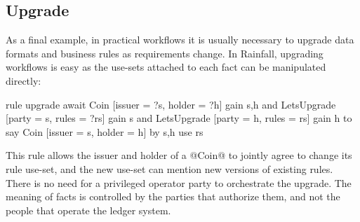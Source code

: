 \subsection{Upgrade}
\label{s:Upgrade}
As a final example, in practical workflows it is usually necessary to upgrade data formats and business rules as requirements change. In Rainfall, upgrading workflows is easy as the use-sets attached to each fact can be manipulated directly:

\begin{small}
\begin{code}
  rule   upgrade
  await  Coin [issuer = ?s, holder = ?h]      gain {s,h}
     and LetsUpgrade [party = s, rules = ?rs] gain {s}
     and LetsUpgrade [party = h, rules =  rs] gain {h}
  to say Coin [issuer = s, holder = h]
      by {s,h} use rs
\end{code}
\end{small}

This rule allows the issuer and holder of a @Coin@ to jointly agree to change its rule use-set, and the new use-set can mention new versions of existing rules. There is no need for a privileged operator party to orchestrate the upgrade. The meaning of facts is controlled by the parties that authorize them, and not the people that operate the ledger system.






